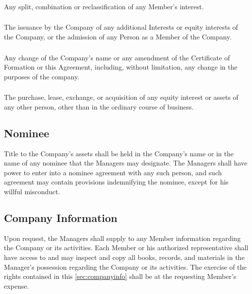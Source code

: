 \documentclass[11pt,onecolumn]{article}
\begin{document}
\subsubsection{}

Any split, combination or reclassification of any Member's interest.

\subsubsection{}

The issuance by the Company of any additional Interests or equity interests of the Company, or the admission of any Person as a Member of the Company.

\subsubsection{}

Any change of the Company's name or any amendment of the Certificate of Formation or this Agreement, including, without limitation, any change in the purposes of the company.

\subsubsection{}

The purchase, lease, exchange, or acquisition of any equity interest or assets of any other person, other than in the ordinary course of business.

\subsection{Nominee}

Title to the Company's assets shall be held in the Company's name or in the name of any nominee that the Managers may designate. The Managers shall have power to enter into a nominee agreement with any such person, and such agreement may contain provisions indemnifying the nominee, except for his willful misconduct.

\subsection{Company Information} \label{sec:companyinfo}

Upon request, the Managers shall supply to any Member information regarding the Company or its activities. Each Member or his authorized representative shall have access to and may inspect and copy all books, records, and materials in the Manager's possession regarding the Company or its activities. The exercise of the rights contained in this \autoref{sec:companyinfo} shall be at the requesting Member's expense.
\end{document}

